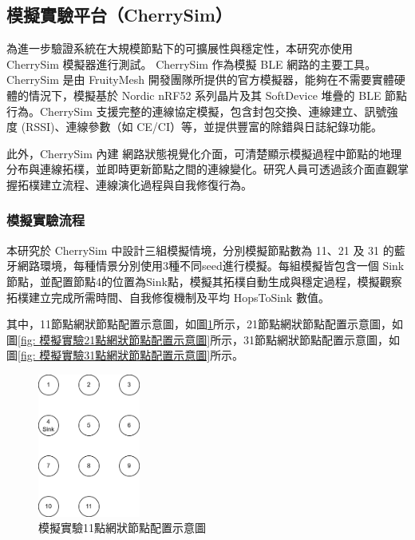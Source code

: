 \begin{ZhChapter}
\subsection{模擬實驗平台（CherrySim）}
為進一步驗證系統在大規模節點下的可擴展性與穩定性，本研究亦使用 CherrySim 模擬器進行測試。 CherrySim 作為模擬 BLE 網路的主要工具。CherrySim 是由 FruityMesh 開發團隊所提供的官方模擬器，能夠在不需要實體硬體的情況下，模擬基於 Nordic nRF52 系列晶片及其 SoftDevice 堆疊的 BLE 節點行為。CherrySim 支援完整的連線協定模擬，包含封包交換、連線建立、訊號強度 (RSSI)、連線參數（如 CE/CI）等，並提供豐富的除錯與日誌紀錄功能。

此外，CherrySim 內建 網路狀態視覺化介面，可清楚顯示模擬過程中節點的地理分布與連線拓樸，並即時更新節點之間的連線變化。研究人員可透過該介面直觀掌握拓樸建立流程、連線演化過程與自我修復行為。

\subsubsection{模擬實驗流程}
本研究於 CherrySim 中設計三組模擬情境，分別模擬節點數為 11、21 及 31 的藍牙網路環境，每種情景分別使用3種不同seed進行模擬。每組模擬皆包含一個 Sink 節點，並配置節點4的位置為Sink點，模擬其拓樸自動生成與穩定過程，模擬觀察拓樸建立完成所需時間、自我修復機制及平均 HopsToSink 數值。

其中，11節點網狀節點配置示意圖，如圖\ref{fig: 模擬實驗11點網狀節點配置示意圖}所示，21節點網狀節點配置示意圖，如圖\ref{fig: 模擬實驗21點網狀節點配置示意圖}所示，31節點網狀節點配置示意圖，如圖\ref{fig: 模擬實驗31點網狀節點配置示意圖}所示。

\begin{figure}[H]
    \centering
    \includegraphics[width = 0.3\textwidth]{image/模擬實驗11點網狀節點配置示意圖.png}
    \caption{模擬實驗11點網狀節點配置示意圖}
    \label{fig: 模擬實驗11點網狀節點配置示意圖}
\end{figure}


\end{ZhChapter}
